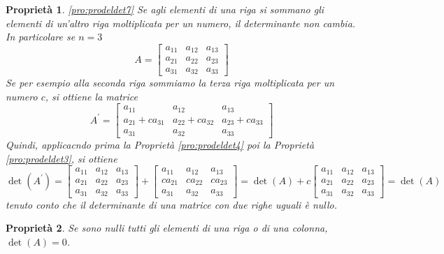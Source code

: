 \documentclass{book}
\theoremstyle{definition}
\theoremstyle{plain}
\newtheorem{pro}{Proprietà}[section]
\begin{document}
\begin{pro}
  \ref{pro:prodeldet7}
  Se agli elementi di una riga si sommano gli elementi di un'altro riga
  moltiplicata per un numero, il determinante non cambia. In particolare
  se $n=3$
  \begin{equation*}
    A=
    \begin{bmatrix}
      a_{11} & a_{12} & a_{13}\\
      a_{21} & a_{22} & a_{23}\\
      a_{31} & a_{32} & a_{33}
    \end{bmatrix}
  \end{equation*}
  Se per esempio alla seconda riga sommiamo la terza riga moltiplicata per
  un numero $c$, si ottiene la matrice
  \begin{equation*}
    A^\prime =
    \begin{bmatrix}
      a_{11} & a_{12} & a_{13}\\
      a_{21}+ca_{31} & a_{22}+ca_{32} & a_{23}+ca_{33}\\
      a_{31} & a_{32} & a_{33}
    \end{bmatrix}
  \end{equation*}
  Quindi, applicacndo prima la Proprietà \ref{pro:prodeldet4} poi la
  Proprietà \ref{pro:prodeldet3}, si ottiene
  \begin{equation*}
    \det(A^\prime)=
    \begin{bmatrix}
      a_{11} & a_{12} & a_{13}\\
      a_{21} & a_{22} & a_{23}\\
      a_{31} & a_{32} & a_{33}
    \end{bmatrix} +
    \begin{bmatrix}
      a_{11} & a_{12} & a_{13}\\
      ca_{21} & ca_{22} & ca_{23}\\
      a_{31} & a_{32} & a_{33}
    \end{bmatrix}=\det(A)+c\begin{bmatrix}
      a_{11} & a_{12} & a_{13}\\
      a_{21} & a_{22} & a_{23}\\
      a_{31} & a_{32} & a_{33}
    \end{bmatrix}=\det(A)
  \end{equation*}
  tenuto conto che il determinante di una matrice con due righe uguali è
  nullo.
\end{pro}
\begin{pro}
  \label{pro:prodeldet8}
  Se sono nulli tutti gli elementi di una riga o di una colonna,
  $\det(A)=0$.
\end{pro}
\end{document}
